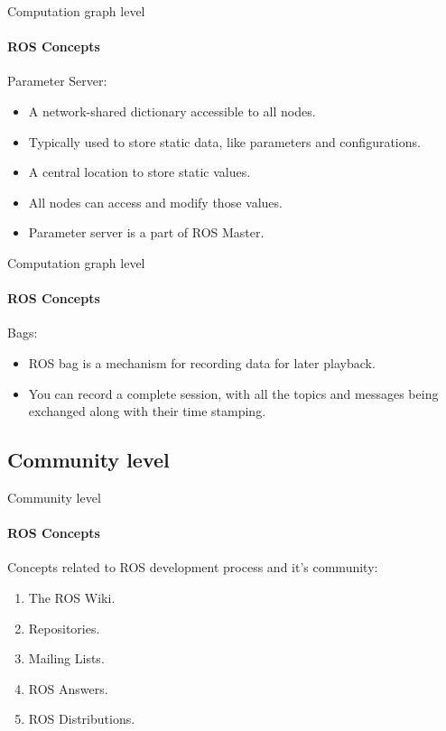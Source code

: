 \documentclass{beamer}
\begin{document}
\begin{frame}{Computation graph level}
    \framesubtitle{ROS Concepts}
    {\huge Parameter Server:}
    \vspace{0.2cm}
    \begin{itemize}
        \item A network-shared dictionary accessible to all nodes.
        \item Typically used to store static data, like parameters and configurations.
        \item A central location to store static values.
        \item  All nodes can access and modify those values.
        \item Parameter server is a part of ROS Master.
    \end{itemize}  
\end{frame}


\begin{frame}{Computation graph level}
    \framesubtitle{ROS Concepts}
    {\huge Bags:}
    \vspace{0.2cm}
    \begin{itemize}
        \item ROS bag is a mechanism for recording data for later playback.
        \item You can record a complete session, with all the topics and messages
        being exchanged along with their time stamping.
    \end{itemize}  
\end{frame}
    
\subsection{Community level}
\begin{frame}{Community level}
    \framesubtitle{ROS Concepts}
    
    Concepts related to ROS development process and it's community:
    
    \begin{enumerate}
        \item The ROS Wiki.
        \item Repositories.
        \item Mailing Lists.
        \item ROS Answers.
        \item ROS Distributions.
    \end{enumerate}
\end{frame}
\end{document}
